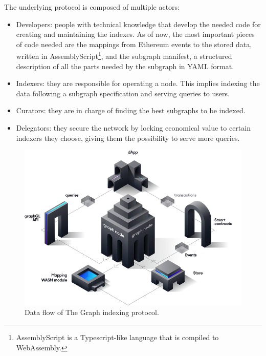 The underlying protocol is composed of multiple actors:

\begin{itemize}
  \item Developers: people with technical knowledge that develop the needed code for creating and maintaining the indexes. As of now, the most important pieces of code needed are the mappings from Ethereum events to the stored data, written in AssemblyScript\footnote{AssemblyScript is a Typescript-like language that is compiled to WebAssembly.}, and the subgraph manifest, a structured description of all the parts needed by the subgraph in YAML format.  
  \item Indexers: they are responsible for operating a node. This implies indexing the data following a subgraph specification and serving queries to users.
  \item Curators: they are in charge of finding the best subgraphs to be indexed.
  \item Delegators: they secure the network by locking economical value to certain indexers they choose, giving them the possibility to serve more queries.
\end{itemize}

\begin{figure}[!ht]
  \centering
  \includegraphics[width=1\textwidth]{Figures/graph-dataflow.png}
  \caption[The Graph data flow]{Data flow of The Graph indexing protocol\protect\footnotemark.}
  \label{fig:the-graph-data-flow}
\end{figure}


